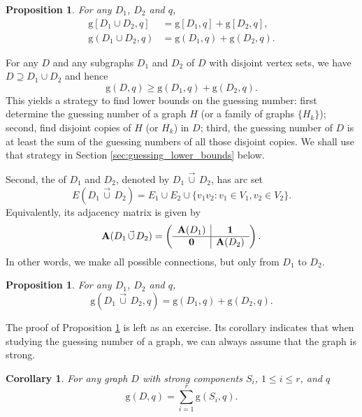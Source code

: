 \documentclass[a4paper, 11pt]{book}
\numberwithin{equation}{section}
\theoremstyle{plain}
\newtheorem{corollary}	[equation]	{Corollary}
\newtheorem{proposition}[equation]	{Proposition}
\newcommand{\vcup}{\,\vec{\cup}\,}
\newcommand{\adjacency}{{\bf A}}
\newcommand{\guessing}{\mathrm{g}}
\renewcommand{\(}{\ldbrack}
\renewcommand{\)}{\rdbrack}
\newcommand{\BF}[1]{{\bf\boldmath{#1}\unboldmath}}
\begin{document}
\begin{proposition} \label{prop:guessing_disjoint_union}
For any $D_1$, $D_2$ and $q$,
\begin{align*}
	\guessing[D_1 \cup D_2, q] &= \guessing[D_1, q] + \guessing[D_2, q],\\
	\guessing(D_1 \cup D_2, q) &= \guessing(D_1, q) + \guessing(D_2, q).
\end{align*}
\end{proposition}

For any $D$ and any subgraphs $D_1$ and $D_2$ of $D$ with disjoint vertex sets, we have $D \supseteq D_1 \cup D_2$ and hence 
\[
	\guessing(D,q) \ge \guessing(D_1, q) + \guessing(D_2, q).
\]
This yields a strategy to find lower bounds on the guessing number: first determine the guessing number of  a graph $H$ (or a family of graphs $\{H_k\}$); second, find disjoint copies of $H$ (or $H_k$) in $D$; third, the guessing number of $D$ is at least the sum of the guessing numbers of all those disjoint copies. We shall use that strategy in Section \ref{sec:guessing_lower_bounds} below.


Second, the \BF{unidirectional union} \label{union of graphs!unidirectional} of $D_1$ and $D_2$, denoted by $D_1 \vcup D_2$, has arc set 
\[
	E(D_1 \vcup D_2) = E_1 \cup E_2 \cup \{v_1v_2: v_1 \in V_1, v_2 \in V_2\}.
\]
Equivalently, its adjacency matrix is given by
\begin{equation} \nonumber
	\adjacency(D_1 \vcup D_2) = \left(\begin{array}{c|c}
	\adjacency(D_1) & {\bf 1}\\
	\hline
	{\bf 0} & \adjacency(D_2)
	\end{array}\right).
\end{equation}
In other words, we make all possible connections, but only from $D_1$ to $D_2$.

\begin{proposition} \label{prop:guessing_unidirectional_union}
For any $D_1$, $D_2$ and $q$,
\[
	\guessing(D_1 \vcup D_2, q) = \guessing(D_1, q) + \guessing(D_2, q).
\]
\end{proposition}
The proof of Proposition \ref{prop:guessing_unidirectional_union} is left as an exercise. Its corollary indicates that when studying the guessing number of a graph, we can always assume that the graph is strong.

\begin{corollary} \label{cor:sum_strongly_connected}
For any graph $D$ with strong components $S_i$,  $1 \le i \le r$, and $q$
\[
	\guessing(D,q) = \sum_{i=1}^r \guessing(S_i, q).
\]
\end{corollary}
\end{document}
